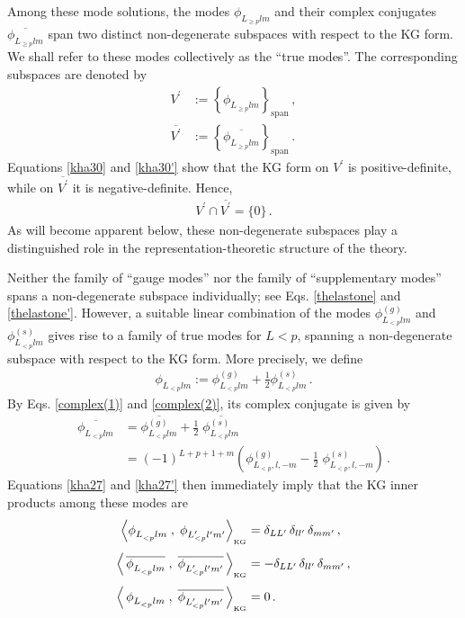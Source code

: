 \documentclass[aps,twocolumn,nofootinbib]{revtex4}
\begin{document}
Among these mode solutions, the modes $\phi^{}_{L^{}_{\geqslant p}lm}$ and their complex conjugates $\overline{\phi^{}_{L^{}_{\geqslant p}lm}}$ span two distinct non-degenerate subspaces with respect to the KG form. We shall refer to these modes collectively as the ``true modes''. The corresponding subspaces are denoted by
\begin{align}
    V^\prime &:= \left\{\phi^{}_{L^{}_{\geqslant p}lm}\right\}_{\mathrm{span}}\,, \label{V'}\\[3pt] \overline{V^\prime} &:= \left\{\overline{\phi^{}_{L^{}_{\geqslant p}lm}}\right\}_{\mathrm{span}}\,. \label{V'bar}
\end{align}
Equations \eqref{kha30} and \eqref{kha30'} show that the KG form on $V^\prime$ is positive-definite, while on $\overline{V^\prime}$ it is negative-definite. Hence,
\begin{align}\label{tru-con}
    V^\prime \cap\overline{V^\prime}=\{0\}\,.
\end{align}
As will become apparent below, these non-degenerate subspaces play a distinguished role in the representation-theoretic structure of the theory.

Neither the family of ``gauge modes'' nor the family of ``supplementary modes'' spans a non-degenerate subspace individually; see Eqs. \eqref{thelastone} and \eqref{thelastone'}. However, a suitable linear combination of the modes $\phi^{(g)}_{L_{<p}^{}lm}$ and $\phi^{(s)}_{L_{<p}^{}lm}$ gives rise to a family of true modes for $L<p$, spanning a non-degenerate subspace with respect to the KG form. More precisely, we define
\begin{align}
    \phi^{}_{L^{}_{<p}lm} := \phi^{(g)}_{L^{}_{<p}lm} + \frac{1}{2} \phi^{(s)}_{L^{}_{<p}lm}\,.\label{eq:up_un_modes1}
\end{align}
By Eqs. \eqref{complex(1)} and \eqref{complex(2)}, its complex conjugate is given by
\begin{align}\label{dada'}
    \overline{\phi^{}_{L^{}_{<p}lm}} &= \overline{\phi^{(g)}_{L^{}_{<p}lm}} + \frac{1}{2} \;\overline{\phi^{(s)}_{L^{}_{<p}lm}} \nonumber\\[3pt]
    &= (-1)^{L+p+1+m}\left(\phi^{(g)}_{L^{}_{<p},l,-m} -\frac{1}{2}\; \phi^{(s)}_{L^{}_{<p},l,-m}\right)\,. 
\end{align}
Equations \eqref{kha27} and \eqref{kha27'} then immediately imply that the KG inner products among these modes are
\begin{align}
    \left\langle \phi^{}_{L_{<p}^{}lm} \;,\; \phi^{}_{L_{<p}^\prime l_{}^\prime m_{}^\prime} \right\rangle_{\vphantom{}_{\text{KG}}} &= \delta_{LL_{}^\prime} \,\delta_{ll_{}^\prime} \,\delta_{mm_{}^\prime} \,,\\[3pt]
    \left\langle\, \overline{\phi^{}_{L_{<p}^{}lm}} \;,\; \overline{\phi^{}_{L_{<p}^\prime l_{}^\prime m_{}^\prime}} \,\right\rangle_{\vphantom{}_{\text{KG}}} &= -\delta_{LL_{}^\prime} \,\delta_{ll_{}^\prime} \,\delta_{mm_{}^\prime} \,,\\[3pt]
    \left\langle\, \phi^{}_{L_{<p}^{}lm} \;,\; \overline{\phi^{}_{L_{<p}^\prime l_{}^\prime m_{}^\prime}} \,\right\rangle_{\vphantom{}_{\text{KG}}} &= 0 \,.
\end{align}
\end{document}
